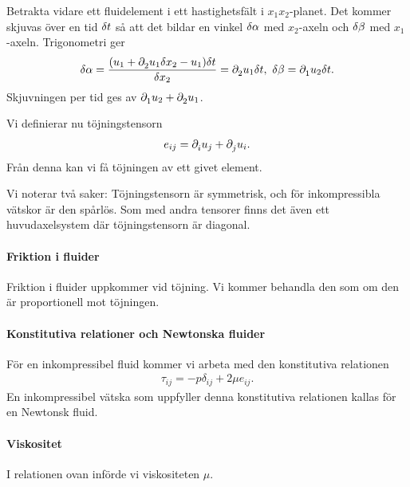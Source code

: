 Betrakta vidare ett fluidelement i ett hastighetsfält i $x_{1}x_{2}$-planet. Det kommer skjuvas över en tid $\delta t$ så att det bildar en vinkel $\delta \alpha$ med $x_{2}$-axeln och $\delta \beta$ med $x_{1}$-axeln. Trigonometri ger
\begin{align*}
	\delta \alpha = \frac{(u_{1} + \partial_{2}^{}u_{1}\delta x_{2} - u_{1})\delta t}{\delta x_{2}} = \partial_{2}^{}u_{1}\delta t,\ \delta \beta = \partial_{1}^{}u_{2}\delta t.
\end{align*}
Skjuvningen per tid ges av $\partial_{1}^{}u_{2} + \partial_{2}^{}u_{1}$.

Vi definierar nu töjningstensorn
\begin{align*}
	e_{ij} = \partial_{i}^{}u_{j} + \partial_{j}^{}u_{i}.
\end{align*}
Från denna kan vi få töjningen av ett givet element.

Vi noterar två saker: Töjningstensorn är symmetrisk, och för inkompressibla vätskor är den spårlös. Som med andra tensorer finns det även ett huvudaxelsystem där töjningstensorn är diagonal.

\paragraph{Friktion i fluider}
Friktion i fluider uppkommer vid töjning. Vi kommer behandla den som om den är proportionell mot töjningen.

\paragraph{Konstitutiva relationer och Newtonska fluider}
För en inkompressibel fluid kommer vi arbeta med den konstitutiva relationen
\begin{align*}
	\tau_{ij} = -p\delta_{ij} + 2\mu e_{ij}.
\end{align*}
En inkompressibel vätska som uppfyller denna konstitutiva relationen kallas för en Newtonsk fluid.

\paragraph{Viskositet}
I relationen ovan införde vi viskositeten $\mu$.

